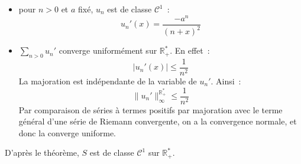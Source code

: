 \documentclass[11pt]{article}
\newcommand{\R}{\mathbb{R}}
\begin{document}
\begin{enumerate}[label=\textbf{\arabic*.}]
\begin{itemize}
        \item pour $n>0$ et $a$ fixé, $u_n$ est de classe $\mathcal{C}^1$~:
            $$u_n'(x) = \frac{-a^n}{(n+x)^2}$$
        \item $\sum_{n>0}u_n'$ converge uniformément sur $\R_+^*$. En effet~:
        $$\vert u_n'(x) \vert \leq \frac{1}{n^2}$$
        La majoration est indépendante de la variable de $u_n'$. Ainsi~:
        $$\lVert u_n' \rVert_\infty^{\R_+^*}\leq \frac{1}{n^2}$$
        Par comparaison de séries à termes positifs par majoration avec le terme général d'une série de Riemann convergente, on a la convergence normale, et donc la converge uniforme.
    \end{itemize}
    D'après le théorème, $S$ est de classe $\mathcal{C}^1$ sur $\R_+^*$.
\end{enumerate}

\vspace{1cm}
\end{document}
